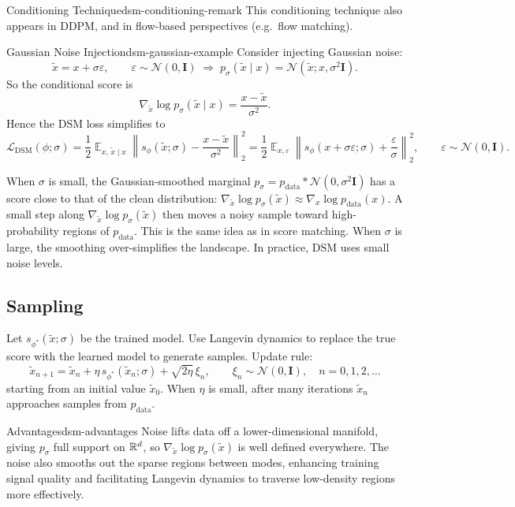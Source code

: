 \documentclass[11pt,a4paper]{article}
\newcommand{\wt}{\widetilde}
\renewcommand{\tilde}{\wt}
\DeclareMathOperator*{\E}{\mathbb{E}}
\newcommand{\pdata}{p_{\mathrm{data}}}
\newcommand{\psigma}{p_{\sigma}}
\begin{document}
\begin{remark}{Conditioning Technique}{dsm-conditioning-remark}
This conditioning technique also appears in DDPM, and in flow-based perspectives (e.g.\ flow matching).
\end{remark}

\begin{example}{Gaussian Noise Injection}{dsm-gaussian-example}
Consider injecting Gaussian noise:
\[
\tilde x=x+\sigma\varepsilon,\qquad \varepsilon\sim\mathcal{N}(0,\mathbf{I})
\;\Longrightarrow\;
\psigma(\tilde x\mid x)=\mathcal{N}(\tilde x; x,\sigma^2\mathbf{I}).
\]
So the conditional score is
\[
\nabla_{\tilde x}\log\psigma(\tilde x\mid x)=\frac{x-\tilde x}{\sigma^2}.
\]
Hence the DSM loss simplifies to
\[
\mathcal{L}_{\mathrm{DSM}}(\phi;\sigma)
=\frac12\E_{x,\,\tilde x\mid x}
\left\|s_{\phi}(\tilde x;\sigma)-\frac{x-\tilde x}{\sigma^2}\right\|_2^2
=\frac12\E_{x,\varepsilon}
\left\|s_{\phi}(x+\sigma\varepsilon;\sigma)+\frac{\varepsilon}{\sigma}\right\|_2^2,
\qquad \varepsilon\sim\mathcal{N}(0,\mathbf{I}).
\]
\end{example}

When $\sigma$ is small, the Gaussian-smoothed marginal $\psigma=\pdata*\mathcal{N}(0,\sigma^2\mathbf{I})$ has a score close to that of the clean distribution: $\nabla_{\tilde x}\log\psigma(\tilde x)\approx\nabla_x\log\pdata(x)$. A small step along $\nabla_{\tilde x}\log\psigma(\tilde x)$ then moves a noisy sample toward high-probability regions of $\pdata$. This is the same idea as in score matching. When $\sigma$ is large, the smoothing over-simplifies the landscape. In practice, DSM uses small noise levels.

\subsection{Sampling}\label{subsec:dsm-sampling}

Let $s_{\phi^*}(\tilde x;\sigma)$ be the trained model. Use Langevin dynamics to replace the true score with the learned model to generate samples. Update rule:
\[
\tilde x_{n+1}=\tilde x_n+\eta\, s_{\phi^*}(\tilde x_n;\sigma)+\sqrt{2\eta}\,\xi_n,
\qquad \xi_n\sim\mathcal{N}(0,\mathbf{I}),\quad n=0,1,2,\dots
\]
starting from an initial value $\tilde x_0$. When $\eta$ is small, after many iterations $\tilde x_n$ approaches samples from $\pdata$.

\begin{remark}{Advantages}{dsm-advantages}
Noise lifts data off a lower-dimensional manifold, giving $\psigma$ full support on $\mathbb{R}^d$, so $\nabla_{\tilde x}\log\psigma(\tilde x)$ is well defined everywhere. The noise also smooths out the sparse regions between modes, enhancing training signal quality and facilitating Langevin dynamics to traverse low-density regions more effectively.
\end{remark}
\end{document}
